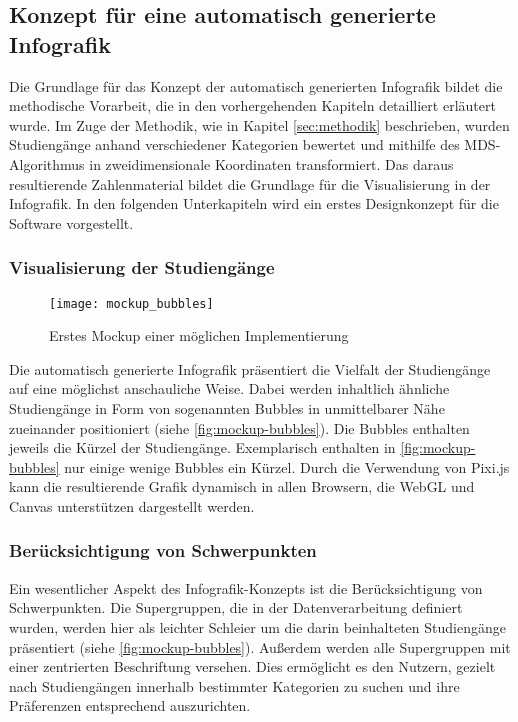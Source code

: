 \subsection{Konzept für eine automatisch generierte Infografik}\label{sec:konzept}
Die Grundlage für das Konzept der automatisch generierten Infografik bildet die
methodische Vorarbeit, die in den vorhergehenden Kapiteln detailliert erläutert
wurde. Im Zuge der Methodik, wie in Kapitel \ref{sec:methodik} beschrieben,
wurden Studiengänge anhand verschiedener Kategorien bewertet und mithilfe des
MDS-Algorithmus in zweidimensionale Koordinaten transformiert. Das daraus
resultierende Zahlenmaterial bildet die Grundlage für die Visualisierung in der
Infografik. In den folgenden Unterkapiteln wird ein erstes Designkonzept für die
Software vorgestellt.

\subsubsection{Visualisierung der Studiengänge}

\begin{figure}[H]
    \centering
    \texttt{[image: mockup\_bubbles]}
    \caption{Erstes Mockup einer möglichen Implementierung}
    \label{fig:mockup-bubbles}
\end{figure}

Die automatisch generierte Infografik präsentiert die Vielfalt der Studiengänge
auf eine möglichst anschauliche Weise. Dabei werden inhaltlich ähnliche
Studiengänge in Form von sogenannten \glqq Bubbles\grqq{} in unmittelbarer Nähe 
zueinander positioniert (siehe \autoref{fig:mockup-bubbles}). Die Bubbles
enthalten jeweils die Kürzel der Studiengänge. Exemplarisch enthalten in
\autoref{fig:mockup-bubbles} nur einige wenige Bubbles ein Kürzel. Durch die
Verwendung von Pixi.js kann die resultierende Graﬁk dynamisch in allen Browsern,
die WebGL und Canvas unterstützen dargestellt werden.

\subsubsection{Berücksichtigung von Schwerpunkten}
Ein wesentlicher Aspekt des Infografik-Konzepts ist die Berücksichtigung von 
Schwerpunkten. Die Supergruppen, die in der Datenverarbeitung definiert wurden, 
werden hier als leichter Schleier um die darin beinhalteten Studiengänge 
präsentiert (siehe \autoref{fig:mockup-bubbles}). Außerdem werden alle
Supergruppen mit einer zentrierten Beschriftung versehen. Dies ermöglicht es den
Nutzern, gezielt nach Studiengängen innerhalb bestimmter Kategorien zu suchen
und ihre Präferenzen entsprechend auszurichten.

